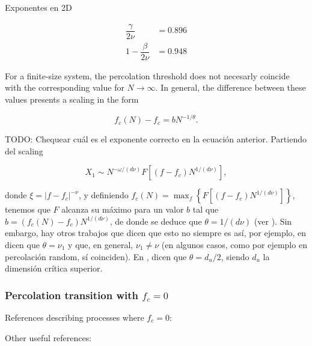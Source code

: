 \documentclass{article}
\begin{document}


Exponentes en 2D

\begin{align}
\dfrac{\gamma}{2\nu} &= 0.896 \\
1-\dfrac{\beta}{2\nu} &= 0.948
\end{align}

For a finite-size system, the percolation threshold does not necesarly coincide with the corresponding value for $N\rightarrow \infty$. In general, the difference between these values presents a scaling in the form

\begin{equation} \label{eq:peak_pos_shift}
f_c(N) - f_c = b N^{-1/\theta}.
\end{equation}

TODO: Chequear cu\'al es el exponente correcto en la ecuaci\'on anterior. Partiendo del scaling

\begin{equation}
X_1 \sim N^{-\omega/(d\nu)} F[(f-f_c)N^{1/(d\nu)}],
\end{equation}

donde $\xi = |f-f_c|^{-\nu}$,
y definiendo $f_c(N) = \max_{f} \left\lbrace F[(f-f_c)N^{1/(d\nu)}] \right\rbrace$, tenemos que $F$ alcanza su m\'aximo para un valor $b$ tal que $b = (f_c(N)-f_c) N^{1/(d\nu)}$, de donde se deduce que $\theta = 1/(d\nu)$ (ver \cite{Ziff2010ScalingLattice,Cho2009}).
Sin embargo, hay otros trabajos que dicen que esto no siempre es as\'i, por ejemplo, en \cite{Fan2020} dicen que $\theta = \nu_1$ y que, en general, $\nu_1 \neq \nu$ (en algunos casos, como por ejemplo en percolaci\'on random, s\'i coinciden). En \cite{DaCosta2010}, dicen que $\theta = d_u/2$, siendo $d_u$ la dimensi\'on cr\'itica superior.

\subsubsection{Percolation transition with $f_c = 0$}

References describing processes where $f_c = 0$: \cite{Rozenfeld2010Small-worldApproach,Trevelyan2018DegreeInformation,Cho2013AvoidingModels}

Other useful references: \cite{Boettcher2012,Trevelyan2018DegreeInformation,Cho2010}
\end{document}
